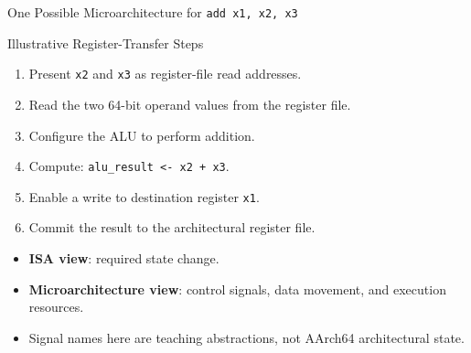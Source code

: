\documentclass[aspectratio=169,11pt,t]{beamer}
\newcommand{\key}[1]{\textbf{#1}}
\newcommand{\code}[1]{\texttt{#1}}
\begin{document}
\begin{frame}{One Possible Microarchitecture for \code{add x1, x2, x3}}

\begin{block}{Illustrative Register-Transfer Steps}

\begin{enumerate}
  \item Present \code{x2} and \code{x3}
        as register-file read addresses.
  \item Read the two 64-bit operand values
        from the register file.
  \item Configure the ALU
        to perform addition.
  \item Compute:
        \code{alu\_result <- x2 + x3}.
  \item Enable a write
        to destination register \code{x1}.
  \item Commit the result
        to the architectural register file.
\end{enumerate}

\end{block}

\vspace{0.15cm}

\begin{itemize}
  \item \key{ISA view}:
        required state change.
  \item \key{Microarchitecture view}:
        control signals,
        data movement,
        and execution resources.
  \item Signal names here are teaching abstractions,
        not AArch64 architectural state.
\end{itemize}

\end{frame}



\end{document}
